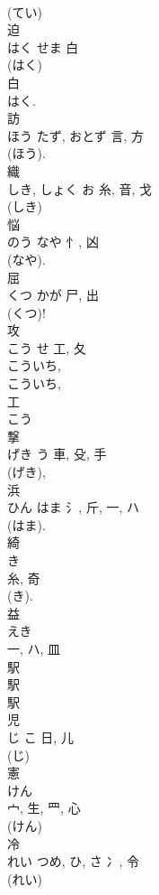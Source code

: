 \documentclass[8pt]{extreport}
\begin{document}
\begin{CJK}{UTF8}{min}
\\	(てい) 
\\	迫	
\\	はく	せま	白		
\\	(はく) 
\\	白 
\\	はく.	
\\	訪	
\\	ほう	たず, おとず	言, 方	
\\	(ほう).
\\	織	
\\	しき, しょく	お	糸, 音, 戈	
\\	(しき) 
\\	悩	
\\	のう	なや	忄, 凶		
\\	(なや). 
\\	屈	
\\	くつ	かが	尸, 出	
\\	(くつ)! 
\\	攻	
\\	こう	せ	工, 夂	
\\	こういち, 
\\	こういち, 
\\	工 
\\	こう 
\\	撃	
\\	げき	う	車, 殳, 手	
\\	(げき), 
\\	浜	
\\	ひん	はま	氵, 斤, 一, ハ	
\\	(はま). 
\\	綺	
\\	き	
\\	糸, 奇	
\\	(き). 
\\	益	
\\	えき	
\\	一, ハ, 皿		
\\	駅 
\\	駅 
\\	駅 
\\	児	
\\	じ	こ	日, 儿		
\\	(じ) 
\\	憲	
\\	けん	
\\	宀, 生, 罒, 心	
\\	(けん) 
\\	冷	
\\	れい	つめ, ひ, さ	冫, 令	
\\	(れい) 

\end{CJK}
\end{document}
